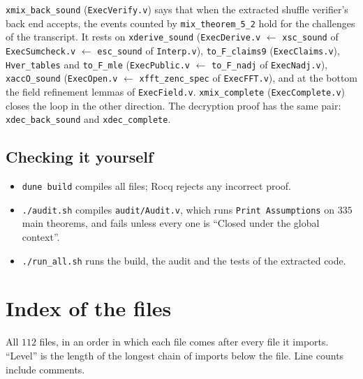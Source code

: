 \documentclass[11pt,a4paper]{article}
\theoremstyle{definition}
\theoremstyle{plain}
\begin{document}
\texttt{xmix\_back\_sound} (\texttt{ExecVerify.v}) says that when the extracted shuffle verifier's back end
accepts, the events counted by \texttt{mix\_theorem\_5\_2} hold for the challenges of the transcript.
It rests on \texttt{xderive\_sound} (\texttt{ExecDerive.v} $\leftarrow$ \texttt{xsc\_sound} of
\texttt{ExecSumcheck.v} $\leftarrow$ \texttt{esc\_sound} of \texttt{Interp.v}), \texttt{to\_F\_claims9}
(\texttt{ExecClaims.v}), \texttt{Hver\_tables} and \texttt{to\_F\_mle} (\texttt{ExecPublic.v} $\leftarrow$
\texttt{to\_F\_nadj} of \texttt{ExecNadj.v}), \texttt{xaccO\_sound} (\texttt{ExecOpen.v} $\leftarrow$
\texttt{xfft\_zenc\_spec} of \texttt{ExecFFT.v}), and at the bottom the field refinement lemmas of
\texttt{ExecField.v}. \texttt{xmix\_complete} (\texttt{ExecComplete.v}) closes the loop in the other
direction. The decryption proof has the same pair: \texttt{xdec\_back\_sound} and \texttt{xdec\_complete}.

\subsection{Checking it yourself}

\begin{itemize}[leftmargin=1.3em]
\item \texttt{dune build} compiles all files; Rocq rejects any incorrect proof.
\item \texttt{./audit.sh} compiles \texttt{audit/Audit.v}, which runs \texttt{Print Assumptions} on $335$ main
  theorems, and fails unless every one is ``Closed under the global context''.
\item \texttt{./run\_all.sh} runs the build, the audit and the tests of the extracted code.
\end{itemize}

\section{Index of the files}
\label{sec:fm-index}

All $112$ files, in an order in which each file comes after every file it imports. ``Level'' is the
length of the longest chain of imports below the file. Line counts include comments.
\end{document}
